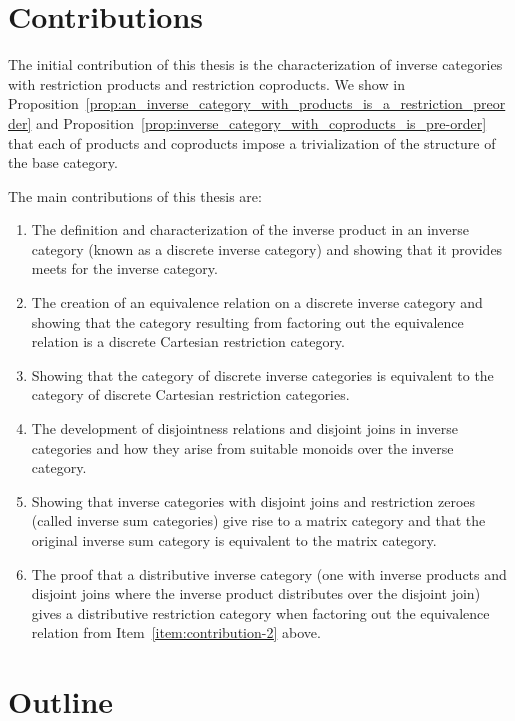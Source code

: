 \section{Contributions}
\label{sec:contributions}

The initial contribution of this thesis is the characterization of inverse categories with
restriction products and restriction coproducts.  We show in
Proposition~\ref{prop:an_inverse_category_with_products_is_a_restriction_preorder} and
Proposition~\ref{prop:inverse_category_with_coproducts_is_pre-order} that each of products and
coproducts impose a trivialization of the structure of the base category.

The main contributions of this thesis are:
\begin{enumerate}
\item The definition and characterization of the inverse product in an inverse category (known as a
  discrete inverse category) and showing  that it provides meets for the inverse category.
\item The creation of an equivalence relation on a discrete inverse category and showing that the
  category resulting from factoring out the equivalence relation is a discrete Cartesian restriction
  category.\label{item:contribution-2}
\item Showing that the category of discrete inverse categories is equivalent to the category of
  discrete Cartesian restriction categories.
\item The development of disjointness relations and disjoint joins in inverse categories and how
  they arise from suitable monoids over the inverse category.
\item Showing that inverse categories with disjoint joins and restriction zeroes (called inverse sum
  categories) give rise to a matrix category and that the original inverse sum category is
  equivalent to the matrix category.
\item The proof that a distributive inverse category (one with inverse products and disjoint joins
  where the inverse product distributes over the disjoint join) gives a distributive restriction
  category when factoring out the equivalence relation from Item~\ref{item:contribution-2} above.
\end{enumerate}

\section{Outline} %
\label{sec:outline}

